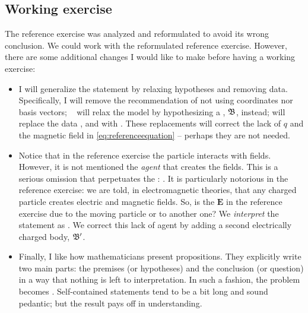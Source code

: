 \subsection{Working exercise}\label{sec:workingexercise}
%
The reference exercise was analyzed and reformulated to avoid its wrong conclusion. We could work with the reformulated reference exercise. However, there are some additional changes I would like to make before having a working exercise:
%
\begin{itemize}
%
\item I will generalize the statement by relaxing hypotheses and removing data. Specifically, I will remove the recommendation of not using coordinates nor basis vectors;
%
~
%
will relax the  model by hypothesizing a , $\mathfrak{B}$, instead; will replace the data ,  and  with . These replacements will correct the lack of $q$ and the magnetic field in \cref{eq:referenceequation} -- perhaps they are not needed.
%
\item Notice that in the reference exercise the particle interacts with fields. However, it is not mentioned the \emph{agent} that creates the fields.
%
%
This is a serious omission that perpetuates the :  \cite{hestenes:1987}. It is particularly notorious in the reference exercise: we are told, in electromagnetic theories, that any charged particle creates electric and magnetic fields. So, is the $\mathbf{E}$ in the reference exercise due to the moving particle or to another one? We \emph{interpret} the statement as . We correct this lack of agent by adding a second electrically charged body, $\mathfrak{B}'$.
%
\item Finally, I like how mathematicians present propositions. They explicitly write two main parts: the premises (or hypotheses) and the conclusion (or question) in a way that nothing is left to interpretation. In such a fashion, the problem becomes . Self-contained statements tend to be a bit long and sound pedantic; but the result pays off in understanding.
%
\end{itemize}

